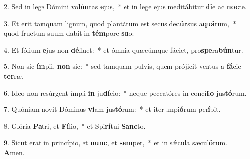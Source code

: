 2. Sed in lege Dómini vo\textbf{lún}tas \textbf{e}jus,~*  et in lege ejus meditábitur \textbf{di}e ac \textbf{noc}te.\

3. Et erit tamquam lignum, quod plantátum est secus de\textbf{cúr}sus a\textbf{quá}rum,~*  quod fructum suum dabit in \textbf{tém}pore \textbf{su}o:\

4. Et fólium \textbf{e}jus non \textbf{dé}fluet:~*  et ómnia quæcúmque fáciet, pro\textbf{spe}ra\textbf{bún}tur.\

5. Non sic \textbf{ím}pii, \textbf{non} sic:~*  sed tamquam pulvis, quem prójicit ventus a \textbf{fá}cie \textbf{ter}ræ.\

6. Ideo non resúrgent ímpii \textbf{in} ju\textbf{dí}cio:~*  neque peccatóres in concíli\textbf{o} jus\textbf{tó}rum.\

7. Quóniam novit Dóminus \textbf{vi}am jus\textbf{tó}rum:~*  et iter impi\textbf{ó}rum per\textbf{í}bit.\

8. Glória \textbf{Pa}tri, et \textbf{Fí}lio,~*  et Spi\textbf{rí}tui \textbf{Sanc}to.\

9. Sicut erat in princípio, et \textbf{nunc}, et \textbf{sem}per,~*  et in sǽcula sæcu\textbf{ló}rum. \textbf{A}men.\

